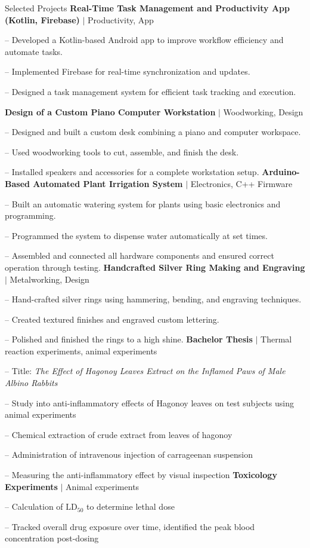 
\begin{rubric}{\faTasks[solid]  Selected Projects}
\entry*[2026][]%
	\textbf{Real-Time Task Management and Productivity App (Kotlin, Firebase)} $|$ Productivity, App \par
	-- Developed a Kotlin-based Android app to improve workflow efficiency and automate tasks.\par
      -- Implemented Firebase for real-time synchronization and updates. \par
      -- Designed a task management system for efficient task tracking and execution.

	\entry*[2026][]%
	\textbf{Design of a Custom Piano Computer Workstation} $|$ Woodworking, Design \par
	-- Designed and built a custom desk combining a piano and computer workspace. \par
	-- Used woodworking tools to cut, assemble, and finish the desk. \par
	-- Installed speakers and accessories for a complete workstation setup.
%
\entry*[2024][]%
	\textbf{Arduino-Based Automated Plant Irrigation System} $|$ Electronics, C++ Firmware \par
	-- Built an automatic watering system for plants using basic electronics and programming. \par
	-- Programmed the system to dispense water automatically at set times. \par
	-- Assembled and connected all hardware components and ensured correct operation through testing.
\entry*[2023][]%
	\textbf{Handcrafted Silver Ring Making and Engraving} $|$ Metalworking, Design \par
	-- Hand-crafted silver rings using hammering, bending, and engraving techniques. \par
	-- Created textured finishes and engraved custom lettering. \par
	-- Polished and finished the rings to a high shine.
%
\entry*[2015][]%
	\textbf{Bachelor Thesis } $|$ Thermal reaction experiments, animal experiments \par
	-- Title: \emph{The Effect of Hagonoy Leaves Extract on the Inflamed Paws of Male Albino Rabbits} \par
	-- Study into anti-inflammatory effects of Hagonoy leaves on test subjects using animal experiments \par
	-- Chemical extraction of crude extract from leaves of hagonoy \par
	-- Administration of intravenous injection of carrageenan suspension \par
	-- Measuring the anti-inflammatory effect by visual inspection 
%
\entry*[2015][] \textbf{Toxicology Experiments} $|$ Animal experiments \par
	-- Calculation of $\mathrm{LD}_{50}$ to determine lethal dose \par
	-- Tracked overall drug exposure over time, identified the peak blood concentration post-dosing 
%
\end{rubric}